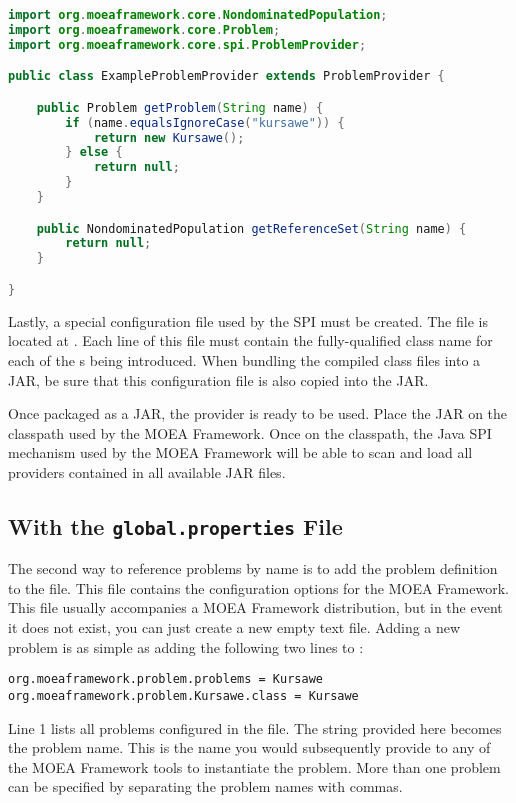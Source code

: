 \begin{lstlisting}[language=Java]
import org.moeaframework.core.NondominatedPopulation;
import org.moeaframework.core.Problem;
import org.moeaframework.core.spi.ProblemProvider;

public class ExampleProblemProvider extends ProblemProvider {

	public Problem getProblem(String name) {
		if (name.equalsIgnoreCase("kursawe")) {
			return new Kursawe();
		} else {
			return null;
		}
	}

	public NondominatedPopulation getReferenceSet(String name) {
		return null;
	}

}
\end{lstlisting}

Lastly, a special configuration file used by the SPI must be created.  The file is located at .  Each line of this file must contain the fully-qualified class name for each of the s being introduced.  When bundling the compiled class files into a JAR, be sure that this configuration file is also copied into the JAR.

Once packaged as a JAR, the provider is ready to be used.  Place the JAR on the classpath used by the MOEA Framework.  Once on the classpath, the Java SPI mechanism used by the MOEA Framework will be able to scan and load all providers contained in all available JAR files.

\subsection{With the \texttt{global.properties} File}
The second way to reference problems by name is to add the problem definition to the  file.  This  file contains the configuration options for the MOEA Framework.  This file usually accompanies a MOEA Framework distribution, but in the event it does not exist, you can just create a new empty text file.  Adding a new problem is as simple as adding the following two lines to :

\begin{lstlisting}[language=Plaintext]
org.moeaframework.problem.problems = Kursawe
org.moeaframework.problem.Kursawe.class = Kursawe
\end{lstlisting}

Line 1 lists all problems configured in the  file.  The string provided here becomes the problem name.  This is the name you would subsequently provide to any of the MOEA Framework tools to instantiate the problem.  More than one problem can be specified by separating the problem names with commas.

